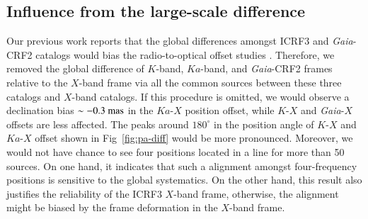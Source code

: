 \documentclass{aa}
\begin{document}




\subsection{Influence from the large-scale difference} \label{subsec:sys-effect}

    Our previous work reports that the global differences amongst ICRF3 and \textit{Gaia}-CRF2 catalogs would bias the radio-to-optical offset studies \citep{2020A&A...634A..28L}.
    Therefore, we removed the global difference of $K$-band, $Ka$-band, and \textit{Gaia}-CRF2 frames relative to the $X$-band frame via all the common sources between these three catalogs and $X$-band catalogs.
    If this procedure is omitted, we would observe a declination bias $\sim-0.3~{\rm mas}$ in the $Ka$-$X$ position offset, while $K$-$X$ and \textit{Gaia}-$X$ offsets are less affected.
    The peaks around $180^\circ$ in the position angle of $K$-$X$ and $Ka$-$X$ offset shown in Fig~\ref{fig:pa-diff} would be more pronounced.
    Moreover, we would not have chance to see four positions located in a line for more than 50 sources.
    On one hand, it indicates that such a alignment amongst four-frequency positions is sensitive to the global systematics.
    On the other hand, this result also justifies the reliability of the ICRF3 $X$-band frame, otherwise, the alignment might be biased by the frame deformation in the $X$-band frame.
\end{document}
